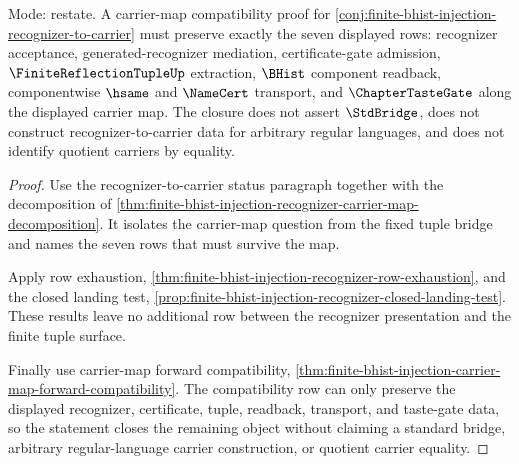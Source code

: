 \begin{theorem}
\label{thm:finite-bhist-injection-carrier-map-compatibility-closure}
Mode: restate. A carrier-map compatibility proof for \autoref{conj:finite-bhist-injection-recognizer-to-carrier} must preserve exactly the seven displayed rows: recognizer acceptance, generated-recognizer mediation, certificate-gate admission, $\FiniteReflectionTupleUp$ extraction, $\BHist$ component readback, componentwise $\hsame$ and $\NameCert$ transport, and $\ChapterTasteGate$ along the displayed carrier map. The closure does not assert $\StdBridge$, does not construct recognizer-to-carrier data for arbitrary regular languages, and does not identify quotient carriers by equality.
\end{theorem}
\begin{proof}
Use the recognizer-to-carrier status paragraph together with the decomposition of \autoref{thm:finite-bhist-injection-recognizer-carrier-map-decomposition}. It isolates the carrier-map question from the fixed tuple bridge and names the seven rows that must survive the map.

Apply row exhaustion, \autoref{thm:finite-bhist-injection-recognizer-row-exhaustion}, and the closed landing test, \autoref{prop:finite-bhist-injection-recognizer-closed-landing-test}. These results leave no additional row between the recognizer presentation and the finite tuple surface.

Finally use carrier-map forward compatibility, \autoref{thm:finite-bhist-injection-carrier-map-forward-compatibility}. The compatibility row can only preserve the displayed recognizer, certificate, tuple, readback, transport, and taste-gate data, so the statement closes the remaining object without claiming a standard bridge, arbitrary regular-language carrier construction, or quotient carrier equality.
\end{proof}

